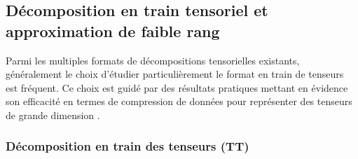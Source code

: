 \documentclass[11pt,a4paper,oneside]{book}
\begin{document}
%








\subsection{Décomposition en train tensoriel et approximation de faible rang}
\label{sec:tens_Ht-TT}
Parmi les multiples formats de décompositions tensorielles existants,  généralement le choix 
d’étudier  particulièrement le format en train de tenseurs est fréquent. Ce choix est guidé par des résultats pratiques
mettant en évidence son efficacité en termes de compression de données pour représenter des tenseurs de grande dimension \cite[p.61]{olivier2017decompositions}.
\subsubsection{Décomposition en train des tenseurs (TT)}

%
\end{document}
